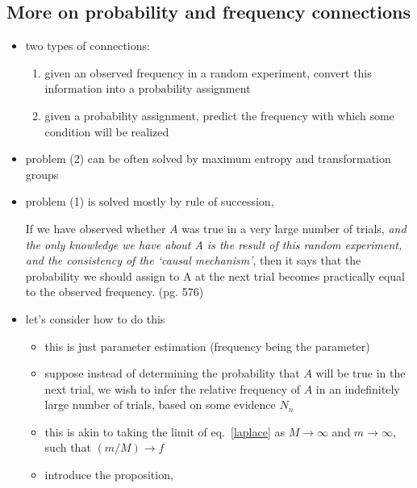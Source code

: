 \documentclass[../jaynes_prob_theory_notes.tex]{subfiles}
\begin{document}
        \subsection{More on probability and frequency connections}
            \begin{itemize} 
                \item two types of connections:
                    \begin{enumerate}
                        \item given an observed frequency in a random experiment, convert this information into a probability assignment
                        \item given a probability assignment, predict the frequency with which some condition will be realized
                    \end{enumerate}
                \item problem (2) can be often solved by maximum entropy and transformation groups
                \item problem (1) is solved mostly by rule of succession,
                    \begin{displayquote} 
                        If we have observed whether \(A\) was true in a very large number of trials, \textit{and the only knowledge we have about A is the result of this random experiment, and the consistency of the `causal mechanism'}, then it says that the probability we should assign to A at the next trial becomes practically equal to the observed frequency. (pg. 576)
                    \end{displayquote}
                \item let's consider how to do this
                    \begin{itemize} 
                        \item this is just parameter estimation (frequency being the parameter)
                        \item suppose instead of determining the probability that \(A\) will be true in the next trial, we wish to infer the relative frequency of \(A\) in an indefinitely large number of trials, based on some evidence \(N_n\)
                        \item this is akin to taking the limit of eq.~\ref{laplace} as \(M \rightarrow \infty\) and \(m \rightarrow \infty\), such that \((m/M) \rightarrow f\)
                        \item introduce the proposition,
                            \begin{displayquote} 

\end{displayquote}
\end{itemize}
\end{itemize}
\end{document}
